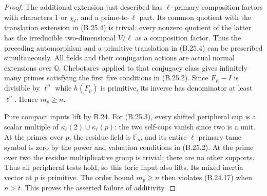 \begin{proof}
The additional extension just described has
$\ell$-primary composition factors with characters
$1$ or $\chi_\ell$, and a prime-to-$\ell$ part.
Its common quotient with the translation extension
in (B.25.4) is trivial: every nonzero quotient
of the latter has the irreducible two-dimensional
$V/\ell$ as a composition factor.
Thus the preceding automorphism and a primitive
translation in (B.25.4) can be prescribed
simultaneously. All fields and their conjugation
actions are actual normal extensions over $\mathbb Q$.
Chebotarev applied to that conjugacy class
\citep[VIII, Theorem 7.4]{BMilneCFT2020}
gives infinitely many primes satisfying the first
five conditions in (B.25.2).
Since $F_E-I$ is divisible by $\ell^n$ while
$h(F_p)$ is primitive, its inverse has denominator
at least $\ell^n$. Hence $m_p\geq n$.

Pure compact inputs lift by B.24.
For (B.25.3), every shifted peripheral cup is a
scalar multiple of $\kappa_\ell(2)\cup\kappa_\ell(p)$:
the two self-cups vanish since two is a unit.
At the primes over $p$, the residue field is
$\mathbb F_p$, and its entire $\ell$-primary
tame symbol is zero by the power and valuation
conditions in (B.25.2).
At the prime over two the residue multiplicative
group is trivial; there are no other supports.
Thus all peripheral tests hold, so this toric
input also lifts. Its mixed inertia vector at
$p$ is primitive. The order bound $m_p\geq n$
then violates (B.24.17) when $n>t$.
This proves the asserted failure of additivity.
\end{proof}

